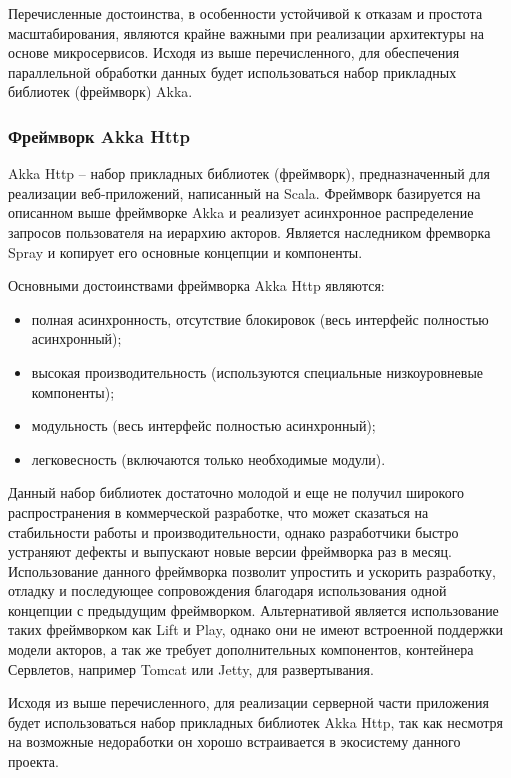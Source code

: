 Перечисленные достоинства, в особенности устойчивой к отказам и простота масштабирования, являются крайне важными при реализации архитектуры на основе микросервисов. Исходя из выше перечисленного, для обеспечения параллельной обработки данных будет использоваться набор прикладных библиотек (фреймворк) Akka. 

\subsubsection{Фреймворк Akka Http}
\label{sec:techs:spray}

Akka Http – набор прикладных библиотек (фреймворк), предназначенный для реализации веб-приложений, написанный на Scala. Фреймворк базируется на описанном выше фреймворке Akka и реализует асинхронное распределение запросов пользователя на иерархию акторов. Является наследником фремворка Spray и копирует его основные концепции и компоненты.

Основными достоинствами фреймворка Akka Http являются:
\begin{itemize}
  \item полная асинхронность, отсутствие блокировок (весь интерфейс полностью асинхронный);
  \item высокая производительность (используются специальные низкоуровневые компоненты);
  \item модульность (весь интерфейс полностью асинхронный);
  \item легковесность (включаются только необходимые модули).
\end{itemize}

Данный набор библиотек достаточно молодой и еще не получил широкого распространения в коммерческой разработке, что может сказаться на стабильности работы и производительности, однако разработчики быстро устраняют дефекты и выпускают новые версии фреймворка раз в месяц. Использование данного фреймворка позволит упростить и ускорить разработку, отладку и последующее сопровождения благодаря использования одной концепции с предыдущим фреймворком.
Альтернативой является использование таких фреймворком как Lift и Play, однако они не имеют встроенной поддержки модели акторов, а так же требует дополнительных компонентов, контейнера Сервлетов, например Tomcat или Jetty, для развертывания.

Исходя из выше перечисленного, для реализации серверной части приложения будет использоваться набор прикладных библиотек Akka Http, так как несмотря на возможные недоработки он хорошо встраивается в экосистему данного проекта.

